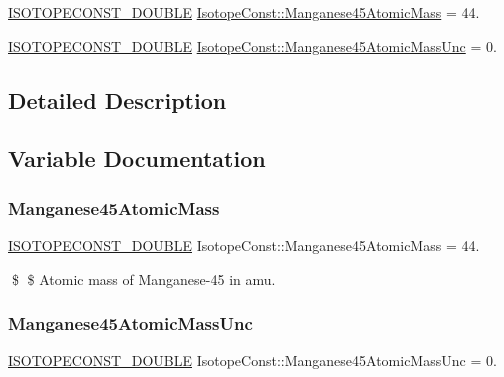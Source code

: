 \begin{DoxyCompactItemize}
\item 
\mbox{\hyperlink{group___isotope_const-_macros_ga8f45a7272ce02c0b4c65c44636ed719a}{I\+S\+O\+T\+O\+P\+E\+C\+O\+N\+S\+T\+\_\+\+D\+O\+U\+B\+LE}} \mbox{\hyperlink{group___isotope_const-_manganese-_mn45_ga7157aa5356cdac3dc7aaaae26256c54c}{Isotope\+Const\+::\+Manganese45\+Atomic\+Mass}} = 44.
\item 
\mbox{\hyperlink{group___isotope_const-_macros_ga8f45a7272ce02c0b4c65c44636ed719a}{I\+S\+O\+T\+O\+P\+E\+C\+O\+N\+S\+T\+\_\+\+D\+O\+U\+B\+LE}} \mbox{\hyperlink{group___isotope_const-_manganese-_mn45_gae324b74dfcb73e1bc8bc23d969a4c027}{Isotope\+Const\+::\+Manganese45\+Atomic\+Mass\+Unc}} = 0.
\end{DoxyCompactItemize}


\subsection{Detailed Description}


\subsection{Variable Documentation}
\mbox{\label{group___isotope_const-_manganese-_mn45_ga7157aa5356cdac3dc7aaaae26256c54c}} 
\subsubsection{\texorpdfstring{Manganese45\+Atomic\+Mass}{Manganese45AtomicMass}}
{\footnotesize\ttfamily \mbox{\hyperlink{group___isotope_const-_macros_ga8f45a7272ce02c0b4c65c44636ed719a}{I\+S\+O\+T\+O\+P\+E\+C\+O\+N\+S\+T\+\_\+\+D\+O\+U\+B\+LE}} Isotope\+Const\+::\+Manganese45\+Atomic\+Mass = 44.}

\$ \$ Atomic mass of Manganese-\/45 in amu. \mbox{\label{group___isotope_const-_manganese-_mn45_gae324b74dfcb73e1bc8bc23d969a4c027}} 
\subsubsection{\texorpdfstring{Manganese45\+Atomic\+Mass\+Unc}{Manganese45AtomicMassUnc}}
{\footnotesize\ttfamily \mbox{\hyperlink{group___isotope_const-_macros_ga8f45a7272ce02c0b4c65c44636ed719a}{I\+S\+O\+T\+O\+P\+E\+C\+O\+N\+S\+T\+\_\+\+D\+O\+U\+B\+LE}} Isotope\+Const\+::\+Manganese45\+Atomic\+Mass\+Unc = 0.}

